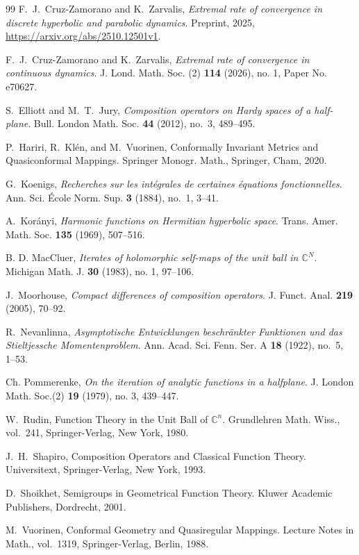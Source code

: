 \documentclass[12pt]{amsart}
\numberwithin{equation}{section}
\theoremstyle{plain}
\theoremstyle{definition}
\begin{document}
\begin{thebibliography}{99}
F.~J.~Cruz-Zamorano and K.~Zarvalis,
\textit{Extremal rate of convergence in discrete hyperbolic and parabolic dynamics}.
Preprint, 2025, \url{https://arxiv.org/abs/2510.12501v1}.

F.~J.~Cruz-Zamorano and K.~Zarvalis, \textit{Extremal rate of convergence in continuous dynamics}. J. Lond. Math. Soc. (2) \textbf{114} (2026), no. 1, Paper No. e70627.

S.~Elliott and M.~T.~Jury,
\textit{Composition operators on Hardy spaces of a half-plane}. Bull. London Math. Soc. \textbf{44} (2012), no.~3, 489--495.

P.~Hariri, R.~Kl\'en, and M.~Vuorinen, Conformally Invariant Metrics and Quasiconformal Mappings.
Springer Monogr. Math.,
Springer, Cham, 2020.

G.~Koenigs,
\textit{Recherches sur les int\'egrales de certaines \'equations fonctionnelles}. Ann. Sci. \'Ecole Norm. Sup. \textbf{3} (1884), no.~1, 3--41.

A.~Kor\'anyi,
\textit{Harmonic functions on Hermitian hyperbolic space}. Trans. Amer. Math. Soc. \textbf{135} (1969), 507--516.

B. D. MacCluer,
\textit{Iterates of holomorphic self-maps of the unit ball in $\mathbb{C}^N$}.
Michigan Math. J. \textbf{30} (1983), no. 1, 97--106.

J.~Moorhouse,
\textit{Compact differences of composition operators}. J. Funct. Anal. \textbf{219} (2005), 70--92.

R.~Nevanlinna,
\textit{Asymptotische Entwicklungen beschr\"ankter Funktionen und
das Stieltjessche Momentenproblem}. Ann. Acad. Sci. Fenn. Ser. A \textbf{18} (1922), no.~5, 1--53.

Ch. Pommerenke, \textit{On the iteration of analytic functions in a halfplane}. J. London Math. Soc.(2) \textbf{19} (1979), no. 3, 439--447.


W.~Rudin,
Function Theory in the Unit Ball of $\mathbb{C}^n$.
Grundlehren Math. Wiss., vol.~241,
Springer-Verlag, New York, 1980.

J.~H.~Shapiro,
Composition Operators and Classical Function Theory.
Universitext,
Springer-Verlag, New York, 1993.

D.~Shoikhet,
Semigroups in Geometrical Function Theory.
Kluwer Academic Publishers, Dordrecht, 2001.

M.~Vuorinen,
Conformal Geometry and Quasiregular Mappings.
Lecture Notes in Math., vol.~1319,
Springer-Verlag, Berlin, 1988.


\end{thebibliography}
\end{document}
